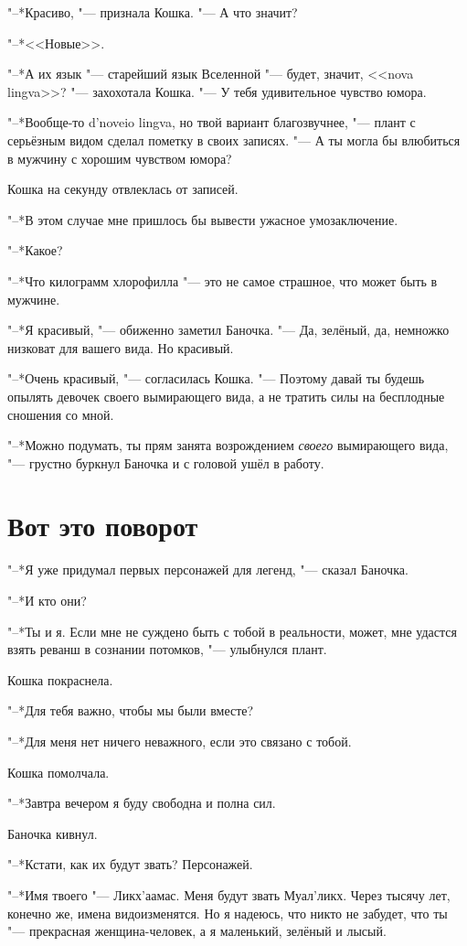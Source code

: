 \documentclass[a4paper,10pt]{book}
\begin{document}
"--*Красиво, "--- признала Кошка. "--- А что значит?

"--*<<Новые>>.

"--*А их язык "--- старейший язык Вселенной "--- будет, значит, <<nova 
lingva>>? "--- захохотала Кошка. "--- У тебя удивительное чувство юмора.

"--*Вообще-то d'noveio lingva, но твой вариант благозвучнее, "--- плант с 
серьёзным видом сделал пометку в своих записях. "--- А ты могла бы влюбиться в 
мужчину с хорошим чувством юмора?

Кошка на секунду отвлеклась от записей.

"--*В этом случае мне пришлось бы вывести ужасное умозаключение.

"--*Какое?

"--*Что килограмм хлорофилла "--- это не самое страшное, что может быть в 
мужчине.

"--*Я красивый, "--- обиженно заметил Баночка. "--- Да, зелёный, да, немножко 
низковат для вашего вида. Но красивый.

"--*Очень красивый, "--- согласилась Кошка. "--- Поэтому давай ты будешь 
опылять девочек своего вымирающего вида, а не тратить силы на бесплодные 
сношения со мной.

"--*Можно подумать, ты прям занята возрождением \textit{своего} вымирающего 
вида, "--- грустно буркнул Баночка и с головой ушёл в работу.

\section{Вот это поворот}


"--*Я уже придумал первых персонажей для легенд, "--- сказал Баночка.

"--*И кто они?

"--*Ты и я. Если мне не суждено быть с тобой в реальности, может, мне удастся взять реванш в сознании потомков, "--- улыбнулся плант.

Кошка покраснела.

"--*Для тебя важно, чтобы мы были вместе?

"--*Для меня нет ничего неважного, если это связано с тобой.

Кошка помолчала.

"--*Завтра вечером я буду свободна и полна сил.

Баночка кивнул.

"--*Кстати, как их будут звать? Персонажей.

"--*Имя твоего "--- Ликх'аамас. Меня будут звать Муал'ликх. Через тысячу лет, конечно же, имена видоизменятся. Но я надеюсь, что никто не забудет, что ты "--- прекрасная женщина-человек, а я маленький, зелёный и лысый.
\end{document}
